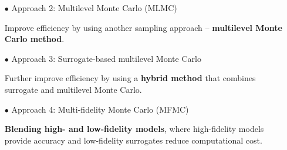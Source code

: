 \documentclass{beamer}
\begin{document}
\begin{frame}[t]
\begin{itemize}[leftmargin=5pt]
{\begin{itemize}[leftmargin=15pt]
                \textcolor{mybrown1}{Replace the nonlinear solution with a {\bf surrogate function} for Monte Carlo sampling.}

                \vspace{2mm}
                \item[\textcolor{myblue3}{$\bullet$}] \textcolor{myblue3}{Approach 2: Multilevel Monte Carlo (MLMC)}
                
                \textcolor{mybrown1}{Improve efficiency by using another sampling approach -- {\bf multilevel Monte Carlo method}.}

                \vspace{2mm}
                \item[\textcolor{myblue3}{$\bullet$}] \textcolor{myblue3}{Approach 3: Surrogate-based multilevel Monte Carlo}
                
                \textcolor{mybrown1}{Further improve efficiency by using a {\bf hybrid method} that combines surrogate and multilevel Monte Carlo. }

                \vspace{2mm}
                \item[\textcolor{myblue3}{$\bullet$}] \textcolor{myblue3}{Approach 4: Multi-fidelity Monte Carlo (MFMC)}
                
                \textcolor{mybrown1}{{\bf Blending high- and low-fidelity models}, where high-fidelity models provide accuracy and low-fidelity surrogates reduce computational cost.}
            \end{itemize}
            }
    \end{itemize}
\end{frame}

    

        
\end{document}
